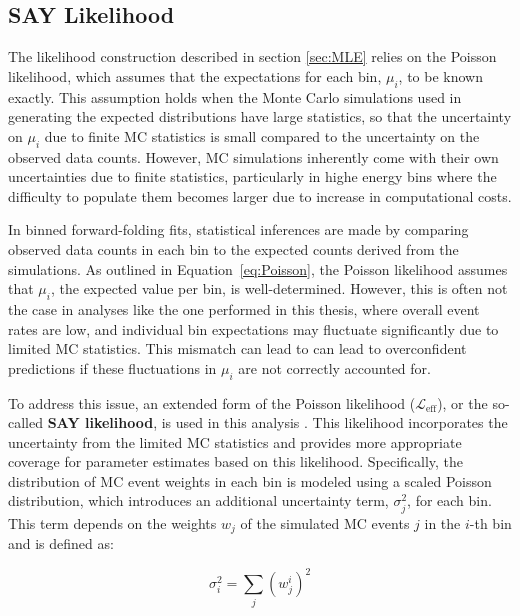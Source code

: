 \subsection{SAY Likelihood}
\label{sec:SAY}

The likelihood construction described in section \ref{sec:MLE} relies on the Poisson likelihood, which assumes that the expectations for each bin, $\mu_i$, to be known exactly. This assumption holds when the Monte Carlo simulations used in generating the expected distributions have large statistics, so that the uncertainty on $\mu_i$ due to finite MC statistics is small compared to the uncertainty on the observed data counts. However, MC simulations inherently come with their own uncertainties due to finite statistics, particularly in highe energy bins where the difficulty to populate them becomes larger due to increase in computational costs.

In binned forward-folding fits, statistical inferences are made by comparing observed data counts in each bin to the expected counts derived from the simulations. As outlined in Equation~\ref{eq:Poisson}, the Poisson likelihood assumes that $\mu_i$, the expected value per bin, is well-determined. However, this is often not the case in analyses like the one performed in this thesis, where overall event rates are low, and individual bin expectations may fluctuate significantly due to limited MC statistics. This mismatch can lead to can lead to overconfident predictions if these fluctuations in $\mu_i$ are not correctly accounted for.

To address this issue, an extended form of the Poisson likelihood ($\mathcal{L}_{\mathrm{eff}}$), or the so-called \textbf{SAY likelihood}, is used in this analysis . This likelihood incorporates the uncertainty from the limited MC statistics and provides more appropriate coverage for parameter estimates based on this likelihood. Specifically, the distribution of MC event weights in each bin is modeled using a scaled Poisson distribution, which introduces an additional uncertainty term, $\sigma_j^2$, for each bin. This term depends on the weights $w_j$ of the simulated MC events $j$ in the $i$-th bin and is defined as:

\begin{equation}
\sigma_i^2 = \sum_{j} (w_j^i)^2
\end{equation}


